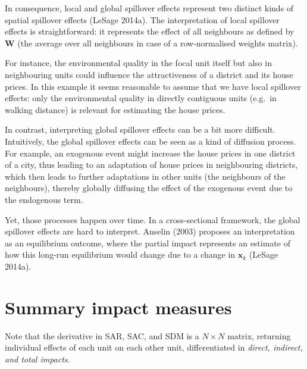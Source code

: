 \documentclass[
  letterpaper,
  DIV=11,
  numbers=noendperiod]{scrreprt}
\begin{document}
In consequence, local and global spillover effects represent two
distinct kinds of spatial spillover effects (LeSage 2014a). The
interpretation of local spillover effects is straightforward: it
represents the effect of all neighbours as defined by
\({\boldsymbol{\mathbf{W}}}\) (the average over all neighbours in case
of a row-normalised weights matrix).

For instance, the environmental quality in the focal unit itself but
also in neighbouring units could influence the attractiveness of a
district and its house prices. In this example it seems reasonable to
assume that we have local spillover effects: only the environmental
quality in directly contiguous units (e.g.~in walking distance) is
relevant for estimating the house prices.

In contrast, interpreting global spillover effects can be a bit more
difficult. Intuitively, the global spillover effects can be seen as a
kind of diffusion process. For example, an exogenous event might
increase the house prices in one district of a city, thus leading to an
adaptation of house prices in neighbouring districts, which then leads
to further adaptations in other units (the neighbours of the
neighbours), thereby globally diffusing the effect of the exogenous
event due to the endogenous term.

Yet, those processes happen over time. In a cross-sectional framework,
the global spillover effects are hard to interpret. Anselin (2003)
proposes an interpretation as an equilibrium outcome, where the partial
impact represents an estimate of how this long-run equilibrium would
change due to a change in \({\boldsymbol{\mathbf{x}}}_k\) (LeSage
2014a).

\hypertarget{summary-impact-measures}{%
\section{Summary impact measures}\label{summary-impact-measures}}

Note that the derivative in SAR, SAC, and SDM is a \(N \times N\)
matrix, returning individual effects of each unit on each other unit,
differentiated in \emph{direct, indirect, and total impacts}.
\end{document}
